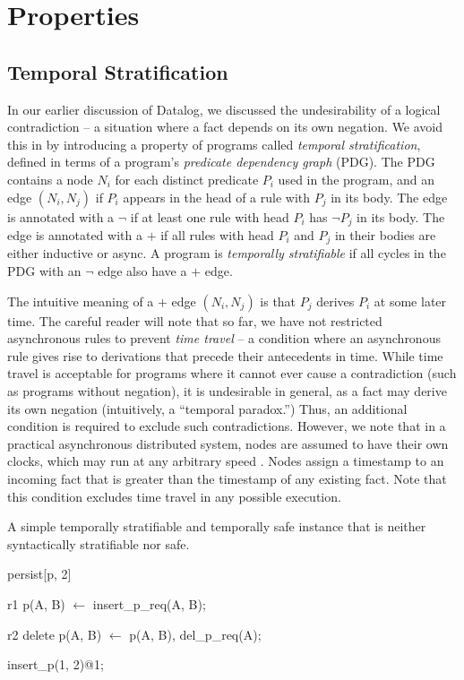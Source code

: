 \section{Properties}

\subsection{Temporal Stratification}

In our earlier discussion of Datalog, we discussed the undesirability of a
logical contradiction -- a situation where a fact depends on its own negation.
We avoid this in \lang by introducing a property of programs called {\em
temporal stratification}, defined in terms of a program's {\em predicate
dependency graph} (PDG).  The PDG contains a node $N_i$ for each distinct
predicate $P_i$ used in the program, and an edge $(N_i, N_j)$ if $P_i$ appears
in the head of a rule with $P_j$ in its body.  The edge is annotated with a
$\lnot$ if at least one rule with head $P_i$ has $\lnot P_j$ in its body.  The
edge is annotated with a $+$ if all rules with head $P_i$ and $P_j$ in their
bodies are either inductive or async.  A \lang program is {\em temporally
stratifiable} if all cycles in the PDG with an $\lnot$ edge also have a $+$
edge.

The intuitive meaning of a $+$ edge $(N_i, N_j)$ is that $P_j$ derives $P_i$ at
some later time.  The careful reader will note that so far, we have not
restricted asynchronous rules to prevent {\em time travel} -- a condition where
an asynchronous rule gives rise to derivations that precede their antecedents
in time.  While time travel is acceptable for programs where it cannot ever
cause a contradiction (such as programs without negation), it is undesirable in
general, as a fact may derive its own negation (intuitively, a ``temporal
paradox.'')  Thus, an additional condition is required to exclude such
contradictions.
However, we note that in a practical asynchronous distributed system, nodes are
assumed to have their own clocks, which may run at any arbitrary speed
.  Nodes assign a
timestamp to an incoming fact that is greater than the timestamp of any
existing fact.  Note that this condition excludes time travel in any possible
execution.

\begin{example}
\label{ex:stratsafe}
A simple temporally stratifiable and temporally safe \slang instance that is
neither syntactically stratifiable nor safe.

\begin{Dedalus}
persist[p, 2]  
  
r1
p(A, B) \(\leftarrow\)
  insert\_p\_req(A, B);

r2  
delete p(A, B) \(\leftarrow\)
  p(A, B),
  del\_p\_req(A);

insert\_p(1, 2)@1;
\end{Dedalus}
\end{example}


